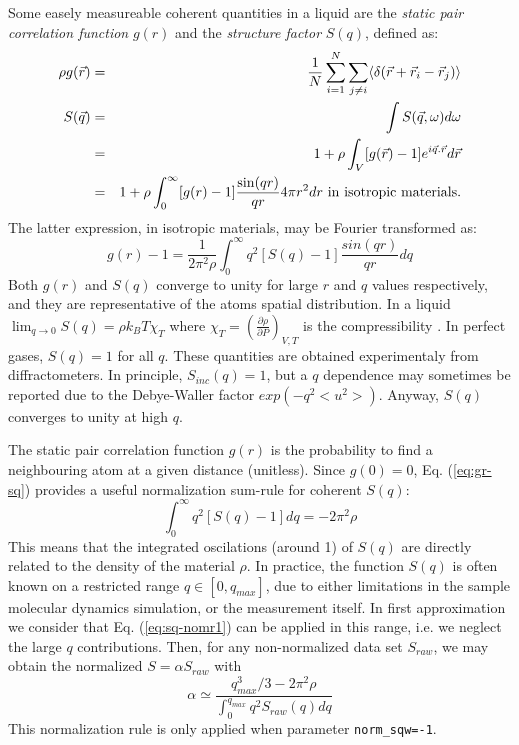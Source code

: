 Some easely measureable coherent quantities in a liquid are the \emph{static pair correlation function} $g(r)$ and the \emph{structure factor} $S(q)$, defined as:
\begin{eqnarray}
\rho g(\vec{r}) &=& \frac{1}{N} \sum_{i=1}^N \sum_{j \neq i} \langle \delta(\vec{r}+\vec{r}_i-\vec{r}_j) \rangle \\
S(\vec{q}) &=&\int S(\vec q,\omega) d\omega \label{eq:sq} \\
           &=&1 + \rho \int_V [g(\vec{r})-1] e^{i\vec{q}.\vec{r}} d\vec{r} \\
           &=&1 + \rho \int_{0}^{\infty} [g(r)-1] \frac{\sin(qr)}{qr} 4 \pi r^2 dr {\rm\ in\ isotropic\ materials.}
\end{eqnarray}
The latter expression, in isotropic materials, may be Fourier transformed as:
\begin{equation}
\label{eq:gr-sq}
g(r)-1 =\frac{1}{2\pi^2 \rho} \int_0^\infty q^2 [S(q) -1] \frac{sin(qr)}{qr} dq
\end{equation}
Both $g(r)$ and $S(q)$ converge to unity for large $r$ and $q$ values respectively, and they are representative of the atoms spatial distribution. In a liquid $\lim_{q \rightarrow 0} S(q) = \rho k_B T \chi_T$ where $\chi_T=(\frac{\partial \rho}{\partial P})_{V,T}$ is the compressibility \cite{Egelstaff67,fischer05}. In perfect gases, $S(q) = 1$ for all $q$. These quantities are obtained experimentaly from diffractometers.
In principle, $S_{inc}(q) = 1$, but a $q$ dependence may sometimes be reported due to the Debye-Waller factor $exp(-q^2<u^2>)$. Anyway, $S(q)$ converges to unity at high $q$.

The static pair correlation function $g(r)$ is the probability to find a neighbouring atom at a given distance (unitless). Since $g(0) = 0$, Eq. (\ref{eq:gr-sq}) provides a useful normalization sum-rule for coherent $S(q)$:
\begin{equation}
\label{eq:sq-nomr1}
\int_0^\infty q^2 [S(q) - 1] dq = -2\pi^2\rho
\end{equation}
This means that the integrated oscilations (around 1) of $S(q)$ are directly related to the density of the material $\rho$.
In practice, the function $S(q)$ is often known on a restricted range $q \in [0, q_{max} ]$, due to either limitations in the sample molecular dynamics simulation, or the measurement itself.
In first approximation we consider that Eq. (\ref{eq:sq-nomr1}) can be applied in this range, i.e. we neglect the large $q$ contributions. Then, for any non-normalized data set $S_{raw}$, we may obtain the normalized $S = \alpha S_{raw}$ with \cite{fischer05}
\begin{equation}
\label{eq:sq-nomr2}
\alpha \simeq \frac{q^3_{max}/3 - 2\pi^2 \rho}{\int_0^{q_{max}} q^2 S_{raw}(q) dq }
\end{equation}
This normalization rule is only applied when parameter \verb+norm_sqw=-1+.

